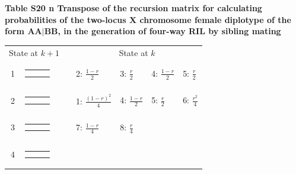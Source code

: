\documentclass[9pt,letterpaper,twoside]{article}
\begin{document}
\newpage

\noindent \textbf{Table S20 {\color{white} n} Transpose of the recursion matrix for
calculating probabilities of the two-locus X chromosome female diplotype of the form $\boldsymbol{AA|BB}$,
in the generation of four-way RIL by sibling mating}

\bigskip

{
\begin{center}
\begin{tabular}{cccllll} \hline
\multicolumn{2}{c}{State at $k+1$} & &
\multicolumn{4}{c}{State at $k$} \\
\cline{1-2} \cline{4-7}
1 &
{\renewcommand{\arraystretch}{0.3}
\renewcommand{\tabcolsep}{0.5mm}
\parbox[b][3mm][c]{12mm}{
\begin{tabular}{|p{2mm}|p{2mm}||p{2mm}|} \hline
$\bullet$ & $\circ  $ &           \\
$\bullet$ & $\circ  $ &           \\ \hline
\end{tabular}}}
&
& 2: $\frac{1-r}{2}$
& 3: $\frac{r}{2}$
& 4: $\frac{1-r}{2}$
& 5: $\frac{r}{2}$
\\
2 &
{\renewcommand{\arraystretch}{0.3}
\renewcommand{\tabcolsep}{0.5mm}
\parbox[b][3mm][c]{12mm}{
\begin{tabular}{|p{2mm}|p{2mm}||p{2mm}|} \hline
$\bullet$ &           & $\circ  $ \\
$\bullet$ &           & $\circ  $ \\ \hline
\end{tabular}}}
&
& 1: $\frac{(1-r)^2}{4}$
& 4: $\frac{1-r}{2}$
& 5: $\frac{r}{2}$
& 6: $\frac{r^2}{4}$
\\
3 &
{\renewcommand{\arraystretch}{0.3}
\renewcommand{\tabcolsep}{0.5mm}
\parbox[b][3mm][c]{12mm}{
\begin{tabular}{|p{2mm}|p{2mm}||p{2mm}|} \hline
$\bullet$ &           & $\circ  $ \\
          & $\bullet$ & $\circ  $ \\ \hline
\end{tabular}}}
&
& 7: $\frac{1-r}{4}$
& 8: $\frac{r}{4}$
& & \\
4 &
{\renewcommand{\arraystretch}{0.3}
\renewcommand{\tabcolsep}{0.5mm}
\parbox[b][3mm][c]{12mm}{
\begin{tabular}{|p{2mm}|p{2mm}||p{2mm}|} \hline
$\circ  $ &           & $\bullet$ \\
$\circ  $ &           & $\bullet$ \\ \hline
\end{tabular}}}

\end{tabular}
\end{center}}
\end{document}

